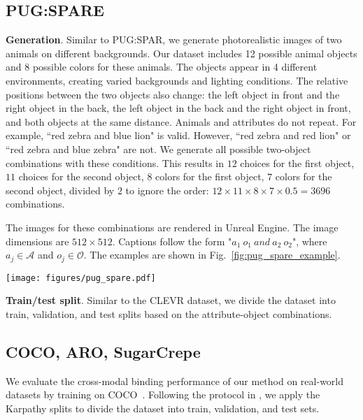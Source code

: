 \subsection{PUG:SPARE}
\label{sec:pugspare}

\textbf{Generation}. Similar to PUG:SPAR, we generate photorealistic images of two animals on different backgrounds. Our dataset includes 12 possible animal objects and 8 possible colors for these animals. The objects appear in 4 different environments, creating varied backgrounds and lighting conditions. The relative positions between the two objects also change: the left object in front and the right object in the back, the left object in the back and the right object in front, and both objects at the same distance. Animals and attributes do not repeat. For example, ``red zebra and blue lion" is valid. However, ``red zebra and red lion" or ``red zebra and blue zebra" are not. We generate all possible two-object combinations with these conditions. This results in $12$ choices for the first object, $11$ choices for the second object, $8$ colors for the first object, $7$ colors for the second object, divided by $2$ to ignore the order: $12\times11\times8\times7\times0.5=3696$ combinations.

The images for these combinations are rendered in Unreal Engine. The image dimensions are $512 \times 512$. Captions follow the form "$a_1 \ o_1 \ \textit{and} \ a_2 \ o_2$", where $a_j \in \mathcal{A}$ and $o_j \in \mathcal{O}$. The examples are shown in Fig.~\ref{fig:pug_spare_example}.
\begin{figure*}[]
  \centering
   \texttt{[image: figures/pug\_spare.pdf]}
   \caption{\textbf{PUG:SPARE dataset examples.} PUG:SPARE offers all possible configurations of two objects from the set of 12 objects, 8 attributes, 4 backgrounds, and 3 position configurations (front/back, back/front, at the same distance). This allows comprehensive testing of attribute-object binding.}
   \label{fig:pug_spare_example}
\end{figure*}

\noindent
\textbf{Train/test split}. Similar to the CLEVR dataset, we divide the dataset into train, validation, and test splits based on the attribute-object combinations.

\subsection{COCO, ARO, SugarCrepe}

We evaluate the cross-modal binding performance of our method on real-world datasets by training on COCO~\cite{lin2014coco}. Following the protocol in \cite{Yuksekgonul2023}, we apply the Karpathy splits to divide the dataset into train, validation, and test sets.

